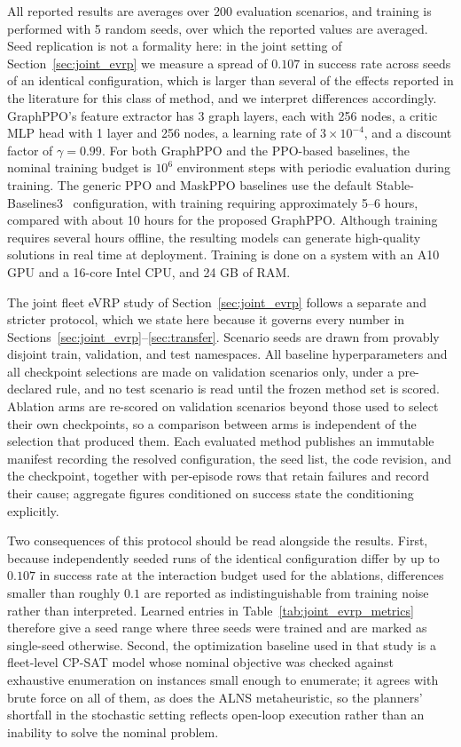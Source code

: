 \documentclass[a4paper,fleqn]{cas-sc}
\begin{document}
All reported results are averages over 200 evaluation scenarios, and training is performed with 5 random seeds, over which the reported values are averaged. Seed replication is not a formality here: in the joint setting of Section~\ref{sec:joint_evrp} we measure a spread of $0.107$ in success rate across seeds of an identical configuration, which is larger than several of the effects reported in the literature for this class of method, and we interpret differences accordingly. GraphPPO's feature extractor has 3 graph layers, each with 256 nodes, a critic MLP head with 1 layer and 256 nodes, a learning rate of $3\times10^{-4}$, and a discount factor of $\gamma = 0.99$. For both GraphPPO and the PPO-based baselines, the nominal training budget is $10^6$ environment steps with periodic evaluation during training. 
The generic PPO and MaskPPO baselines use the default Stable-Baselines3~\cite{sb3} configuration, with training requiring approximately 5--6 hours, compared with about 10 hours for the proposed GraphPPO. Although training requires several hours offline, the resulting models can generate high-quality solutions in real time at deployment.
Training is done on a system with an A10 GPU and a 16-core Intel CPU, and 24 GB of RAM. 

The joint fleet eVRP study of Section~\ref{sec:joint_evrp} follows a separate and stricter protocol, which we state here because it governs every number in Sections~\ref{sec:joint_evrp}--\ref{sec:transfer}. Scenario seeds are drawn from provably disjoint train, validation, and test namespaces. All baseline hyperparameters and all checkpoint selections are made on validation scenarios only, under a pre-declared rule, and no test scenario is read until the frozen method set is scored. Ablation arms are re-scored on validation scenarios beyond those used to select their own checkpoints, so a comparison between arms is independent of the selection that produced them. Each evaluated method publishes an immutable manifest recording the resolved configuration, the seed list, the code revision, and the checkpoint, together with per-episode rows that retain failures and record their cause; aggregate figures conditioned on success state the conditioning explicitly.

Two consequences of this protocol should be read alongside the results. First, because independently seeded runs of the identical configuration differ by up to $0.107$ in success rate at the interaction budget used for the ablations, differences smaller than roughly $0.1$ are reported as indistinguishable from training noise rather than interpreted. Learned entries in Table~\ref{tab:joint_evrp_metrics} therefore give a seed range where three seeds were trained and are marked as single-seed otherwise. Second, the optimization baseline used in that study is a fleet-level CP-SAT model whose nominal objective was checked against exhaustive enumeration on instances small enough to enumerate; it agrees with brute force on all of them, as does the ALNS metaheuristic, so the planners' shortfall in the stochastic setting reflects open-loop execution rather than an inability to solve the nominal problem.
\end{document}
